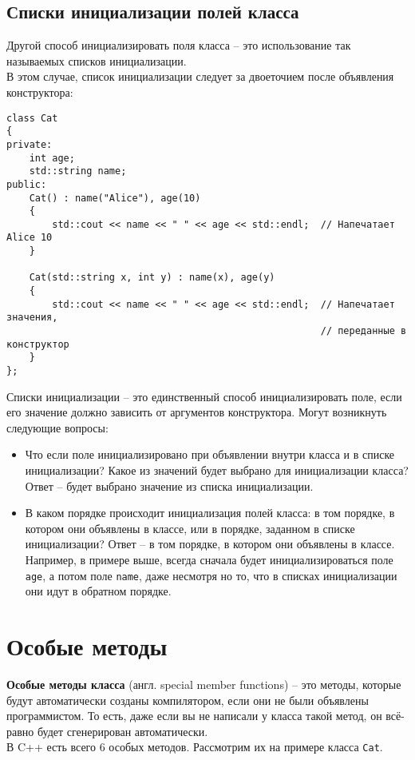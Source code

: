 \documentclass{article}
\begin{document}
\subsection*{Списки инициализации полей класса}
Другой способ инициализировать поля класса -- это использование так называемых списков инициализации.\\ В этом случае, список инициализации следует за двоеточием после объявления конструктора:
\begin{lstlisting}
class Cat
{
private:
	int age;
	std::string name;
public:	
	Cat() : name("Alice"), age(10) 
	{
		std::cout << name << " " << age << std::endl;  // Напечатает Alice 10
	}
	
	Cat(std::string x, int y) : name(x), age(y)
	{
		std::cout << name << " " << age << std::endl;  // Напечатает значения, 
												       // переданные в конструктор
	}
};
\end{lstlisting}
Списки инициализации -- это единственный способ инициализировать поле, если его значение должно зависить от аргументов конструктора. Могут возникнуть следующие вопросы:

\begin{itemize}
\item Что если поле инициализировано при объявлении внутри класса и в списке инициализации? Какое из значений будет выбрано для инициализации класса? Ответ -- будет выбрано значение из списка инициализации.
\item В каком порядке происходит инициализация полей класса: в том порядке, в котором они объявлены в классе, или в порядке, заданном в списке инициализации? Ответ -- в том порядке, в котором они объявлены в классе. Например, в примере выше, всегда сначала будет инициализироваться поле \texttt{age}, а потом поле \texttt{name}, даже несмотря но то, что в списках инициализации они идут в обратном порядке.
\end{itemize}


\newpage
\section*{Особые методы}
\noindent \textbf{Особые методы класса} (англ. special member functions) -- это методы, которые будут автоматически созданы компилятором, если они не были объявлены программистом. То есть, даже если вы не написали у класса такой метод, он всё-равно будет сгенерирован автоматически.\\
В C++ есть всего 6 особых методов. Рассмотрим их на примере класса \texttt{Cat}.
\end{document}
